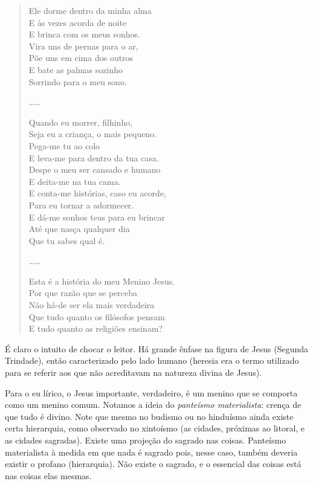 \begin{verse}
Ele dorme dentro da minha alma \\
E às vezes acorda de noite \\
E brinca com os meus sonhos. \\
Vira uns de pernas para o ar, \\
Põe uns em cima dos outros \\
E bate as palmas sozinho \\
Sorrindo para o meu sono.

……

Quando eu morrer, filhinho, \\
Seja eu a criança, o mais pequeno. \\
Pega-me tu ao colo \\
E leva-me para dentro da tua casa. \\
Despe o meu ser cansado e humano \\
E deita-me na tua cama. \\
E conta-me histórias, caso eu acorde, \\
Para eu tornar a adormecer. \\
E dá-me sonhos teus para eu brincar \\
Até que nasça qualquer dia \\
Que tu sabes qual é.

……

Esta é a história do meu Menino Jesus. \\
Por que razão que se perceba \\
Não há-de ser ela mais verdadeira \\
Que tudo quanto os filósofos pensam \\
E tudo quanto as religiões ensinam?
\end{verse}

É claro o intuito de chocar o leitor. Há grande ênfase na figura de Jesus (Segunda Trindade), então caracterizado pelo lado humano (heresia era o termo utilizado para se referir aos que não acreditavam na natureza divina de Jesus).

Para o eu lírico, o Jesus importante, verdadeiro, é um menino que se comporta como um menino comum. Notamos a ideia do \textit{panteísmo materialista}: crença de que tudo é divino. Note que mesmo no budismo ou no hinduísmo ainda existe certa hierarquia, como observado no xintoísmo (as cidades, próximas ao litoral, e as cidades sagradas). Existe uma projeção do sagrado nas coisas. Panteísmo materialista à medida em que nada é sagrado pois, nesse caso, também deveria existir o profano (hierarquia). Não existe o sagrado, e o essencial das coisas está nas coisas elas mesmas.

